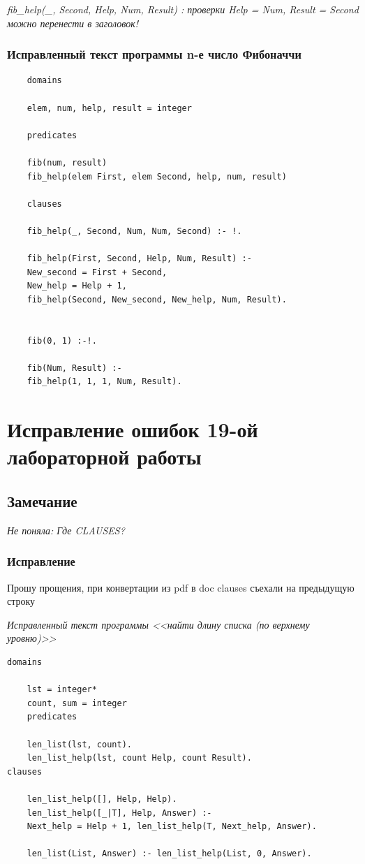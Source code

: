 \documentclass[a4paper,12pt]{article}
\begin{document}
	\textit{fib\_help(\_, Second, Help, Num, Result) :   проверки  Help = Num, Result = Second можно перенести в заголовок!}
	
	\subsubsection*{Исправленный текст программы n-е число Фибоначчи}
	
	\begin{verbatim}
	domains
	
	elem, num, help, result = integer
	
	predicates
	
	fib(num, result)
	fib_help(elem First, elem Second, help, num, result)
	
	clauses
	
	fib_help(_, Second, Num, Num, Second) :- !.
	
	fib_help(First, Second, Help, Num, Result) :- 
	New_second = First + Second,
	New_help = Help + 1, 
	fib_help(Second, New_second, New_help, Num, Result).
	
	
	fib(0, 1) :-!.
	
	fib(Num, Result) :- 
	fib_help(1, 1, 1, Num, Result).
	\end{verbatim}
	
	\section*{Исправление ошибок 19-ой лабораторной работы}
	
	\subsection*{Замечание}
	
	\textit{Не поняла: Где CLAUSES?}
	
	\subsubsection*{Исправление}
	
	Прошу прощения, при конвертации из pdf в doc clauses съехали на предыдущую строку
	
	\textit{Исправленный текст программы <<найти длину списка (по верхнему уровню)>>}
	
	\begin{verbatim}
domains
	
	lst = integer*
	count, sum = integer
	predicates
	
	len_list(lst, count).
	len_list_help(lst, count Help, count Result).
clauses
	
	len_list_help([], Help, Help).
	len_list_help([_|T], Help, Answer) :- 
	Next_help = Help + 1, len_list_help(T, Next_help, Answer).
	
	len_list(List, Answer) :- len_list_help(List, 0, Answer).
	\end{verbatim}
	
\end{document}
